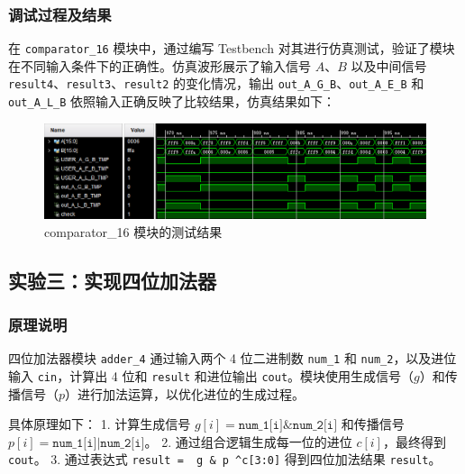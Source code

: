 \documentclass[zihao=5, UTF8]{article}
\theoremstyle{MyLineTheoremStyle} %
\theoremstyle{MyBlockTheoremStyle} %
\theoremstyle{MySubsubsectionStyle} %
\begin{document}
\subsubsection{调试过程及结果}
在 \texttt{comparator\_16} 模块中，通过编写 Testbench 对其进行仿真测试，验证了模块在不同输入条件下的正确性。仿真波形展示了输入信号 $A$、$B$ 以及中间信号 \texttt{result4}、\texttt{result3}、\texttt{result2} 的变化情况，输出 \texttt{out\_A\_G\_B}、\texttt{out\_A\_E\_B} 和 \texttt{out\_A\_L\_B} 依照输入正确反映了比较结果，仿真结果如下：
\begin{figure}[htbp]
    \centering
    \includegraphics[width=\textwidth]{comparator_16.png} %
    \caption{comparator\_16 模块的测试结果}
    \label{fig:comparator_16模块的测试结果}
\end{figure}

\subsection{实验三：实现四位加法器}
\subsubsection{原理说明}
四位加法器模块 \texttt{adder\_4} 通过输入两个 4 位二进制数 \texttt{num\_1} 和 \texttt{num\_2}，以及进位输入 \texttt{cin}，计算出 4 位和 \texttt{result} 和进位输出 \texttt{cout}。模块使用生成信号（$g$）和传播信号（$p$）进行加法运算，以优化进位的生成过程。

具体原理如下：
1. 计算生成信号 $g[i] = \texttt{num\_1[i]} \& \texttt{num\_2[i]}$ 和传播信号 $p[i] = \texttt{num\_1[i]} | \texttt{num\_2[i]}$。
2. 通过组合逻辑生成每一位的进位 $c[i]$，最终得到 \texttt{cout}。
3. 通过表达式 \texttt{result = ~g \& p \textasciicircum c[3:0]} 得到四位加法结果 \texttt{result}。
\end{document}
